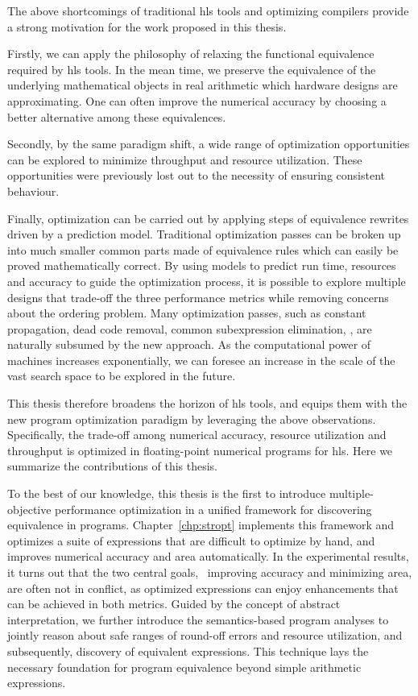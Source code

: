 The above shortcomings of traditional \gls{hls} tools and optimizing compilers
provide a strong motivation for the work proposed in this thesis.

Firstly, we can apply the philosophy of relaxing the functional equivalence
required by \gls{hls} tools.  In the mean time, we preserve the equivalence of
the underlying mathematical objects in real arithmetic which hardware designs
are approximating.  One can often improve the numerical accuracy by choosing a
better alternative among these equivalences.

Secondly, by the same paradigm shift, a wide range of optimization
opportunities can be explored to minimize throughput and resource utilization.
These opportunities were previously lost out to the necessity of ensuring
consistent behaviour.

Finally, optimization can be carried out by applying steps of equivalence
rewrites driven by a prediction model.  Traditional optimization passes can be
broken up into much smaller common parts made of equivalence rules which can
easily be proved mathematically correct.  By using models to predict run time,
resources and accuracy to guide the optimization process, it is possible to
explore multiple designs that trade-off the three performance metrics while
removing concerns about the ordering problem.  Many optimization passes, such
as constant propagation, dead code removal, common subexpression elimination,
\etc, are naturally subsumed by the new approach.  As the computational power
of machines increases exponentially, we can foresee an increase in the scale of
the vast search space to be explored in the future.

This thesis therefore broadens the horizon of \gls{hls} tools, and equips
them with the new program optimization paradigm by leveraging the above
observations.  Specifically, the trade-off among numerical accuracy, resource
utilization and throughput is optimized in floating-point numerical programs
for \gls{hls}\@.  Here we summarize the contributions of this thesis.

To the best of our knowledge, this thesis is the first to introduce
multiple-objective performance optimization in a unified framework for
discovering equivalence in programs.  Chapter~\ref{chp:stropt} implements this
framework and optimizes a suite of expressions that are difficult to optimize
by hand, and improves numerical accuracy and area automatically.  In the
experimental results, it turns out that the two central goals, \ie~improving
accuracy and minimizing area, are often not in conflict, as optimized
expressions can enjoy enhancements that can be achieved in both metrics.
Guided by the concept of abstract interpretation, we further introduce the
semantics-based program analyses to jointly reason about safe ranges of
round-off errors and resource utilization, and subsequently, discovery of
equivalent expressions.  This technique lays the necessary foundation for
program equivalence beyond simple arithmetic expressions.

